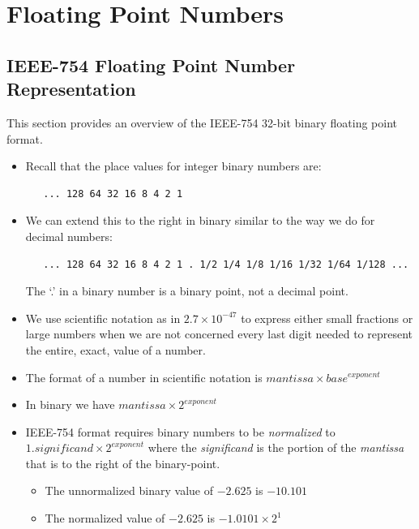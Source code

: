 \chapter{Floating Point Numbers}
\label{chapter:floatingpoint}

\section{IEEE-754 Floating Point Number Representation}
\label{chapter::floatingpoint}

This section provides an overview of the IEEE-754 32-bit binary floating
point format.\cite{ieee:754}

\begin{itemize}
\item Recall that the place values for integer binary numbers are:
\begin{verbatim}
   ... 128 64 32 16 8 4 2 1
\end{verbatim}
\item We can extend this to the right in binary similar to the way we do for
decimal numbers:
\begin{verbatim}
   ... 128 64 32 16 8 4 2 1 . 1/2 1/4 1/8 1/16 1/32 1/64 1/128 ...
\end{verbatim}
The `.' in a binary number is a binary point, not a decimal point.

\item We use scientific notation as in $2.7 \times 10^{-47}$ to express either
small fractions or large numbers when we are not concerned every last digit
needed to represent the entire, exact, value of a number.

\item The format of a number in scientific notation is $mantissa \times base^{exponent}$

\item In binary we have $mantissa \times 2^{exponent}$

\item IEEE-754 format requires binary numbers to be {\em normalized} to
$1.significand \times 2^{exponent}$ where the {\em significand}
is the portion of the {\em mantissa} that is to the right of the binary-point.

\begin{itemize}
\item The unnormalized binary value of $-2.625$ is $-10.101$
\item The normalized value of $-2.625$ is $-1.0101 \times 2^1$
\end{itemize}


\end{itemize}
